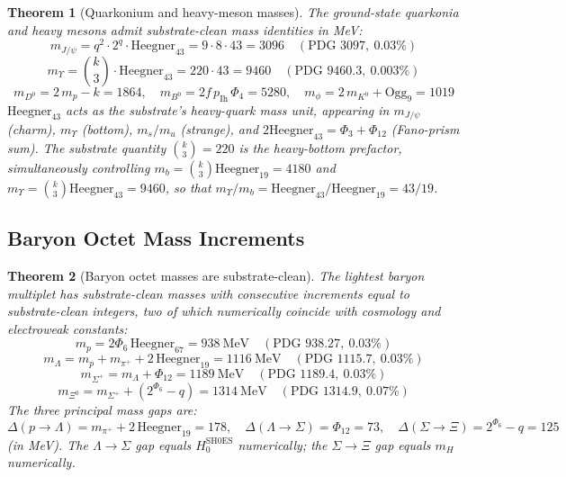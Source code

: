 \documentclass[11pt]{article}
\newtheorem{theorem}{Theorem}[section]
\begin{document}
\begin{theorem}[Quarkonium and heavy-meson masses]\label{thm:quarkonium}
The ground-state quarkonia and heavy mesons admit substrate-clean
mass identities in MeV:
\[
  m_{J/\psi}  = q^2\cdot 2^q\cdot\mathrm{Heegner}_{43} = 9\cdot 8\cdot 43 = 3096
  \quad (\text{PDG } 3097,\ 0.03\%)
\]
\[
  m_{\Upsilon}  = \binom{k}{3}\cdot\mathrm{Heegner}_{43} = 220\cdot 43 = 9460
  \quad (\text{PDG } 9460.3,\ 0.003\%)
\]
\[
  m_{D^0}  = 2\,m_p - k = 1864,\quad
  m_{B^0}  = 2f\,p_{\mathrm{Ih}}\,\Phi_4 = 5280,\quad
  m_\phi  = 2\,m_{K^0} + \mathrm{Ogg}_9 = 1019
\]
$\mathrm{Heegner}_{43}$ acts as the substrate's heavy-quark mass unit,
appearing in $m_{J/\psi}$ (charm), $m_{\Upsilon}$ (bottom), $m_s/m_u$
(strange), and $2\mathrm{Heegner}_{43} = \Phi_3+\Phi_{12}$ (Fano-prism sum).
The substrate quantity $\binom{k}{3} = 220$ is the
\emph{heavy-bottom prefactor}, simultaneously controlling
$m_b = \binom{k}{3}\mathrm{Heegner}_{19} = 4180$ and
$m_\Upsilon = \binom{k}{3}\mathrm{Heegner}_{43} = 9460$, so that
$m_\Upsilon/m_b = \mathrm{Heegner}_{43}/\mathrm{Heegner}_{19} = 43/19$.
\end{theorem}

\subsection{Baryon Octet Mass Increments}

\begin{theorem}[Baryon octet masses are substrate-clean]\label{thm:baryon_octet}
The lightest baryon multiplet has substrate-clean masses with
consecutive increments equal to substrate-clean integers, two of
which numerically coincide with cosmology and electroweak constants:
\[
  m_p       =  2\Phi_6\,\mathrm{Heegner}_{67} = 938~\mathrm{MeV}
              \quad (\text{PDG } 938.27,\ 0.03\%)
\]
\[
  m_\Lambda =  m_p + m_{\pi^+} + 2\,\mathrm{Heegner}_{19} = 1116~\mathrm{MeV}
              \quad (\text{PDG } 1115.7,\ 0.03\%)
\]
\[
  m_{\Sigma^+} =  m_\Lambda + \Phi_{12} = 1189~\mathrm{MeV}
              \quad (\text{PDG } 1189.4,\ 0.03\%)
\]
\[
  m_{\Xi^0} =  m_{\Sigma^+} + (2^{\Phi_6} - q) = 1314~\mathrm{MeV}
              \quad (\text{PDG } 1314.9,\ 0.07\%)
\]
The three principal mass gaps are:
\[
  \Delta(p\to\Lambda) = m_{\pi^+}+2\,\mathrm{Heegner}_{19} = 178, \quad
  \Delta(\Lambda\to\Sigma) = \Phi_{12} = 73, \quad
  \Delta(\Sigma\to\Xi) = 2^{\Phi_6}-q = 125
\]
(in MeV).  The $\Lambda\to\Sigma$ gap equals $H_0^{\mathrm{SH0ES}}$
numerically; the $\Sigma\to\Xi$ gap equals $m_H$ numerically.
\end{theorem}
\end{document}
